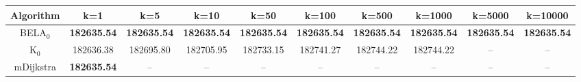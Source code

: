 \begin{tabular}{c|ccccccccc}\toprule
Algorithm & k=1 & k=5 & k=10 & k=50 & k=100 & k=500 & k=1000 & k=5000 & k=10000 \\ \midrule
BELA$_0$ & \textbf{182635.54} & \textbf{182635.54} & \textbf{182635.54} & \textbf{182635.54} & \textbf{182635.54} & \textbf{182635.54} & \textbf{182635.54} & \textbf{182635.54} & \textbf{182635.54} \\
K$_0$ & 182636.38 & 182695.80 & 182705.95 & 182733.15 & 182741.27 & 182744.22 & 182744.22 & -- & -- \\
mDijkstra & \textbf{182635.54} & -- & -- & -- & -- & -- & -- & -- & -- \\ \bottomrule 
\end{tabular}
